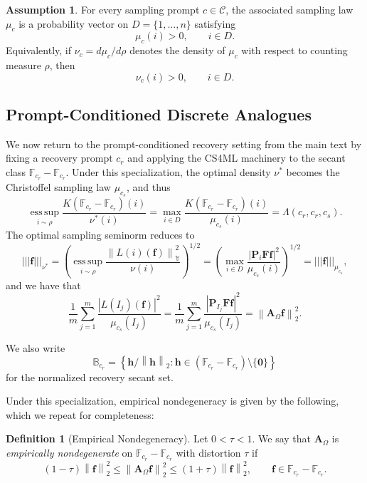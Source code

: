 \documentclass{article}
\theoremstyle{plain}
\theoremstyle{definition}
\newtheorem{definition}[theorem]{Definition}
\newtheorem{assumption}[theorem]{Assumption}
\theoremstyle{remark}
\newcommand*{\snorm}[2]{\left\vert\!\left\vert\!\left\vert #1 \right\vert\!\right\vert\!\right\vert_{#2}}
\begin{document}
\begin{assumption}
  \label{assump: full-support-general}
  For every sampling prompt $c\in\mathcal C$, the associated sampling law
  $\mu_c$ is a probability vector on $D=\{1,\dots,n\}$ satisfying
  \[
    \mu_c(i)>0,
    \qquad i\in D.
  \]
  Equivalently, if $\nu_c=d\mu_c/d\rho$ denotes the density of $\mu_c$
  with respect to counting measure $\rho$, then
  \[
    \nu_c(i)>0,
    \qquad i\in D.
  \]
\end{assumption}

\subsection{Prompt-Conditioned Discrete Analogues}

We now return to the prompt-conditioned recovery setting from the main text by fixing a recovery prompt $c_r$ and applying the CS4ML machinery to the secant class $\mathbb{F}_{c_r}-\mathbb{F}_{c_r}$. Under this specialization, the optimal density $\nu^*$ becomes the Christoffel sampling law $\mu_{c_s}$, and thus
\[
  \operatorname*{ess\,sup}_{i\sim\rho}
  \frac{K(\mathbb{F}_{c_r}-\mathbb{F}_{c_r})(i)}{\nu^*(i)}
  =
  \max_{i \in D}
  \frac{K(\mathbb{F}_{c_r}-\mathbb{F}_{c_r})(i)}{\mu_{c_s}(i)}
  =
  \Lambda(c_r,c_r,c_s).
\]
The optimal sampling seminorm reduces to
\[
  \snorm{\mathbf f}{\nu^*}
  =
   \left(
    \operatorname*{ess\,sup}_{i \sim \rho}
    \frac{\left\|L(i)(\mathbf{f})\right\|_{\mathbb{Y}}^2}{\nu(i)}
  \right)^{1/2} 
  = 
  \left(
    \max_{i \in D}
    \frac{|\mathbf P_i\mathbf F\mathbf f|^2}{\mu_{c_s}(i)}
  \right)^{1/2}
  =
  \snorm{\mathbf f}{\mu_{c_s}},
\]
and we have that
\[
  \frac{1}{m}\sum_{j=1}^m
  \frac{|L(I_j)(\mathbf f)|^2}{\mu_{c_s}(I_j)}
  =
  \frac{1}{m}\sum_{j=1}^m
  \frac{|\mathbf P_{I_j}\mathbf F\mathbf f|^2}{\mu_{c_s}(I_j)}
  =
  \left\|\mathbf A_\Omega \mathbf f\right\|_2^2.
\]

We also write
\[
  \mathbb B_{c_r}
  =
  \left\{
    \mathbf h/\left\|\mathbf h\right\|_2
    :
    \mathbf h\in
    \left(\mathbb F_{c_r}-\mathbb F_{c_r}\right)\setminus\{\mathbf 0\}
  \right\}
\]
for the normalized recovery secant set.

 Under this specialization, empirical nondegeneracy is given by the following, which we repeat for completeness:

\begin{definition}[Empirical Nondegeneracy]
  Let $0<\tau<1$. We say that $\mathbf A_\Omega$ is \emph{empirically nondegenerate} on $\mathbb{F}_{c_r}-\mathbb{F}_{c_r}$ with distortion $\tau$ if
  \[
    \left(1-\tau\right)\left\|\mathbf f\right\|_2^2
    \leq
    \left\|\mathbf A_\Omega \mathbf f\right\|_2^2
    \leq
    \left(1+\tau\right)\left\|\mathbf f\right\|_2^2,
    \qquad
    \mathbf f\in \mathbb{F}_{c_r}-\mathbb{F}_{c_r}.
  \]
\end{definition}
\end{document}
